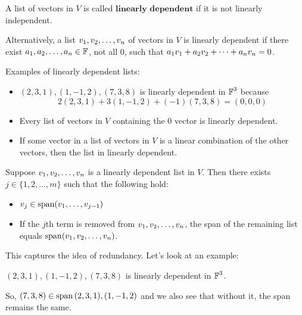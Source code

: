 \begin{definition}
    A list of vectors in $V$ is called $\textbf{linearly dependent}$ if it is not linearly independent.

    Alternatively, a list $v_1, v_2, \ldots, v_n$ of vectors in $V$ is linearly dependent if there exist
    $a_1, a_2, \ldots, a_n \in \operatorname{\mathbb{F}}$, not all 0, such that $a_1v_1 + a_2v_2 + \cdots + a_nv_n = 0$.
\end{definition}

\begin{example}
    Examples of linearly dependent lists:
    \begin{itemize}
        \item $(2, 3, 1), (1, -1, 2), (7, 3, 8)$ is linearly dependent in $\operatorname{\mathbb{F}}^3$ because
        \[ 2(2, 3, 1) + 3 (1, -1, 2) + (-1)(7, 3, 8) = (0, 0, 0)\]
        \item Every list of vectors in $V$ containing the 0 vector is linearly dependent.
        \item If some vector in a list of vectors in $V$ is a linear combination of the other vectors, then
        the list in linearly dependent.
    \end{itemize}
\end{example}

\begin{theorem}
    Suppose $v_1, v_2, \ldots, v_n$ is a linearly dependent list in $V$. Then there exists
    $j \in \{ 1, 2, \dots, m \}$ such that the following hold:
    \begin{itemize}
        \item $v_j \in \operatorname{span}(v_1, \dots, v_{j - 1})$
        \item If the $j$th term is removed from $v_1, v_2, \ldots, v_n$, the span of
        the remaining list equals $\operatorname{span}(v_1, v_2, \ldots, v_n)$.
    \end{itemize}
\end{theorem}

This captures the idea of redundancy. Let's look at an example:

$(2, 3, 1), (1, -1, 2), (7, 3, 8)$ is linearly dependent in $\operatorname{\mathbb{F}}^3$.

So, $(7, 3, 8) \in \operatorname{span}{(2, 3, 1), (1, -1, 2)}$ and we also see that without it,
the span remains the same.

